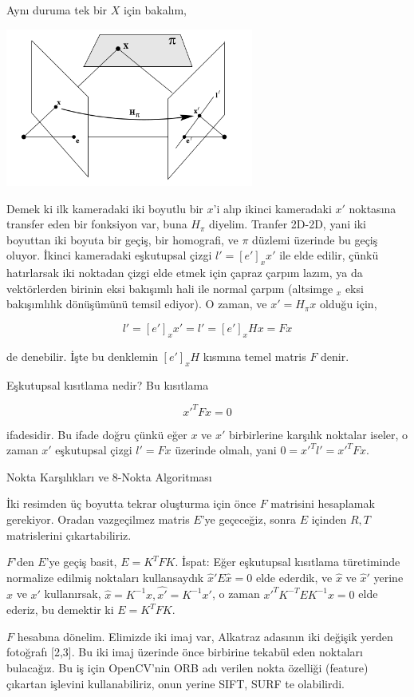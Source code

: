 \documentclass[12pt,fleqn]{article}\usepackage{../../common}
\begin{document}
Aynı duruma tek bir $X$ için bakalım,

\includegraphics[width=22em]{vision_20recons_06.png}

Demek ki ilk kameradaki iki boyutlu bir $x$'i alıp ikinci kameradaki $x'$
noktasına transfer eden bir fonksiyon var, buna $H_{\pi}$ diyelim. Tranfer
2D-2D, yani iki boyuttan iki boyuta bir geçiş, bir homografi, ve $\pi$
düzlemi üzerinde bu geçiş oluyor. İkinci kameradaki eşkutupsal çizgi
$l' = [e']_x x'$ ile elde edilir, çünkü hatırlarsak iki noktadan çizgi elde
etmek için çapraz çarpım lazım, ya da vektörlerden birinin eksi bakışımlı
hali ile normal çarpım (altsimge $_x$ eksi bakışımlılık dönüşümünü temsil
ediyor). O zaman, ve $x' = H_\pi x$ olduğu için,

$$ l' = [e']_x x' = l' = [e']_x H x = F x $$

de denebilir. İşte bu denklemin $[e']_xH$ kısmına temel matris $F$ denir.

Eşkutupsal kısıtlama nedir? Bu kısıtlama

$$ x'^T F x = 0$$

ifadesidir. Bu ifade doğru çünkü eğer $x$ ve $x'$ birbirlerine karşılık
noktalar iseler, o zaman $x'$ eşkutupsal çizgi $l' = Fx$ üzerinde olmalı,
yani $0 = x'^T l' = x'^T F x$.

Nokta Karşılıkları ve 8-Nokta Algoritması

İki resimden üç boyutta tekrar oluşturma için önce $F$ matrisini hesaplamak
gerekiyor. Oradan vazgeçilmez matris $E$'ye geçeceğiz, sonra $E$ içinden
$R,T$ matrislerini çıkartabiliriz.

$F$'den $E$'ye geçiş basit, $E = K^TFK$. İspat: Eğer eşkutupsal kısıtlama
türetiminde normalize edilmiş noktaları kullansaydık
$\hat{x}'E \hat{x} = 0$ elde ederdik, ve $\hat{x}$ ve $\hat{x}'$ yerine $x$
ve $x'$ kullanırsak, $\hat{x} = K ^{-1}x, \hat{x'} = K ^{-1}x'$, o zaman
$x'^TK^{-T}E K ^{-1}x = 0$ elde ederiz, bu demektir ki $E = K ^T F K$.

$F$ hesabına dönelim. Elimizde iki imaj var, Alkatraz adasının iki değişik
yerden fotoğrafı [2,3]. Bu iki imaj üzerinde önce birbirine tekabül eden
noktaları bulacağız. Bu iş için OpenCV'nin ORB adı verilen nokta özelliği
(feature) çıkartan işlevini kullanabiliriz, onun yerine SIFT, SURF te
olabilirdi.
\end{document}
